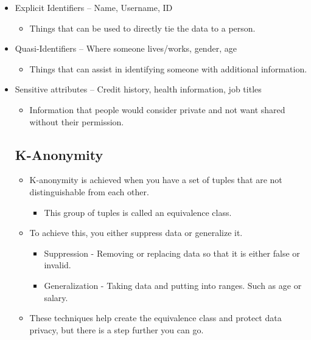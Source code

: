 \documentclass[12pt]{article}
\begin{document}
\begin{itemize}
    \item Explicit Identifiers – Name, Username, ID
    \begin{itemize}
        \item Things that can be used to directly tie the data to a person. 
    \end{itemize}
    \item Quasi-Identifiers – Where someone lives/works, gender, age
    \begin{itemize}
        \item Things that can assist in identifying someone with additional information.
    \end{itemize}
    \item Sensitive attributes – Credit history, health information, job titles
    \begin{itemize}
        \item Information that people would consider private and not want shared without their permission. 
    \end{itemize}

\adjustwidth{3em}{0pt}
\subsection{K-Anonymity}
\begin{itemize}
    \item K-anonymity is achieved when you have a set of tuples that are not distinguishable from each other.
\begin{itemize}
        \item This group of tuples is called an equivalence class. 
    \end{itemize}
    \item To achieve this, you either suppress data or generalize it. 
    \begin{itemize}
        \item Suppression - Removing or replacing data so that it is either false or invalid. 
        \item Generalization - Taking data and putting into ranges. Such as age or salary. 
    \end{itemize}
    \item These techniques help create the equivalence class and protect data privacy, but there is a step further you can go. 
\end{itemize}

\end{itemize}
\end{document}
